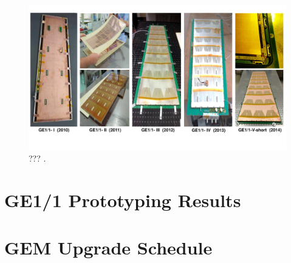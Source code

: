     \begin{figure}[h!]
      \centering
      \includegraphics[width=\textwidth]{img/II-1-gem/generations.pdf}
      \caption{??? \cite{Colaleo:2021453}.}
      \label{fig:II-1-gem-generations}
    \end{figure}

  \section{GE1/1 Prototyping Results}

































  \section{GEM Upgrade Schedule}
